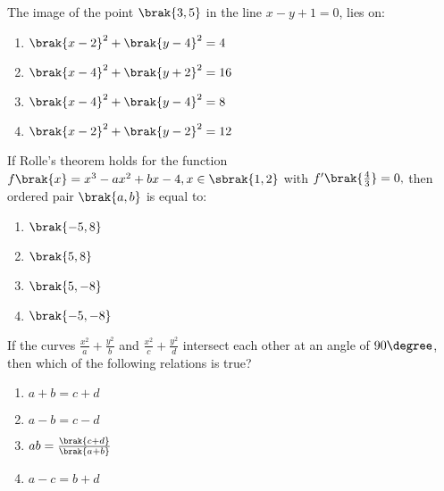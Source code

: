 \item The image of the point $\brak{3,5}$ in the line $x-y+1=0$, lies on$\colon$ \hfill{}
\begin{enumerate}
    \item $\brak{x-2}^{2}+\brak{y-4}^{2}=4$
    \item $\brak{x-4}^{2}+\brak{y+2}^{2}=16$
    \item $\brak{x-4}^{2}+\brak{y-4}^{2}=8$
    \item $\brak{x-2}^{2}+\brak{y-2}^{2}=12$
\end{enumerate}
\item If Rolle's theorem holds for the function $f\brak{x}=x^{3}-ax^{2}+bx-4, x \in \sbrak{1,2}$ with $f^{\prime}\brak{\frac{4}{3}}=0,$ then ordered pair $\brak{a,b}$ is equal to$\colon$ \hfill{}
\begin{enumerate}
    \item $\brak{-5,8}$
    \item $\brak{5,8}$
    \item $\brak{5,-8}$
    \item $\brak{-5,-8}$
\end{enumerate}
\item If the curves $\frac{x^{2}}{a}+\frac{y^{2}}{b}$ and $\frac{x^{2}}{c}+\frac{y^{2}}{d}$ intersect each other at an angle of $90\degree$, then which of the following relations is true? \hfill{}
\begin{enumerate}
    \item $a+b=c+d$
    \item $a-b=c-d$
    \item $ab=\frac{\brak{c+d}}{\brak{a+b}}$
    \item $a-c=b+d$
\end{enumerate}
